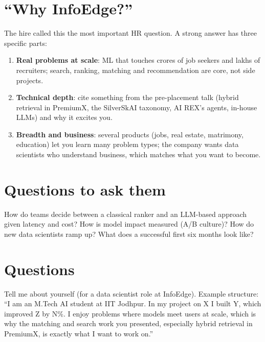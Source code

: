 \section{``Why InfoEdge?''}
The hire called this the most important HR question. A strong answer has three specific parts:
\begin{enumerate}
\item \textbf{Real problems at scale}: ML that touches crores of job seekers and lakhs of recruiters; search, ranking, matching and recommendation are core, not side projects.
\item \textbf{Technical depth}: cite something from the pre-placement talk (hybrid retrieval in PremiumX, the SilverSkAI taxonomy, AI REX's agents, in-house LLMs) and why it excites you.
\item \textbf{Breadth and business}: several products (jobs, real estate, matrimony, education) let you learn many problem types; the company wants data scientists who understand
  business, which matches what you want to become.
\end{enumerate}

\section{Questions to ask them}
How do teams decide between a classical ranker and an LLM-based approach given latency and cost? How is model impact measured (A/B culture)? How do new data scientists ramp up?
What does a successful first six months look like?

\section{Questions}

\begin{qa}{Tell me about yourself (for a data scientist role at InfoEdge).}
\why Example structure: ``I am an M.Tech AI student at IIT Jodhpur. In my project on X I built Y, which improved Z by N\%. I enjoy problems where models meet users at scale, which is why the
matching and search work you presented, especially hybrid retrieval in PremiumX, is exactly what I want to work on.''
\end{qa}


